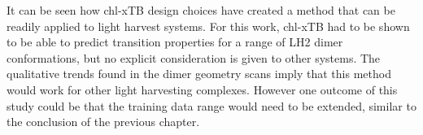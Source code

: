 It can be seen how chl-xTB design choices have created a method that can be readily 
applied to light harvest systems. For this work, chl-xTB had to be shown to be able
to predict transition properties for a range of LH2 dimer conformations, but no 
explicit consideration is given to other systems. The qualitative trends found in
the dimer geometry scans imply that this method would work for other light harvesting
complexes. However one outcome of this study could be that the training data range
would need to be extended, similar to the conclusion of the previous chapter. 

